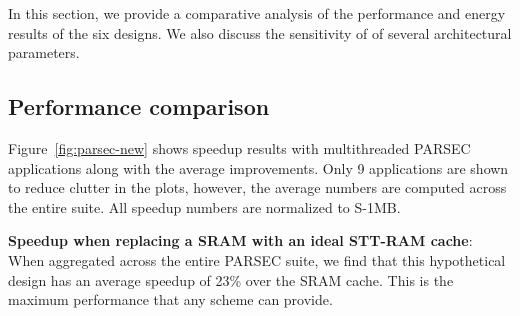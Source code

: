 In this section, we provide a comparative analysis of the performance and energy results of the six designs.
We also discuss the sensitivity of of several architectural parameters.



\begin{figure*} [t]
\centering
 \caption{\label{fig:parsec-new} \scriptsize \bf Normalized speedup for PARSEC Applications }
\end{figure*}

\begin{figure*} [t]
\centering
 \caption{\label{fig:writebacks} \scriptsize \bf Number of Write backs normalized to M-4MB for PARSEC applications}
\end{figure*}

\begin{figure*} [t]
\centering
 \caption{\label{fig:writebacks-spec} \scriptsize \bf Number of Write backs normalized to M-4MB for SPEC multiprogrammed mixes}
\end{figure*}


\subsection {Performance comparison}


Figure~\ref{fig:parsec-new} shows speedup results with multithreaded PARSEC
applications along with the average improvements. Only 9 applications are shown to reduce clutter in the plots, however,
the average numbers are computed across the entire suite. All speedup numbers are normalized to S-1MB.

{\bf Speedup when replacing a SRAM with an ideal STT-RAM cache}: When aggregated across the entire PARSEC suite, we find that this hypothetical design has an average speedup of 23\% over the SRAM cache. This is the maximum performance that any scheme can provide.

